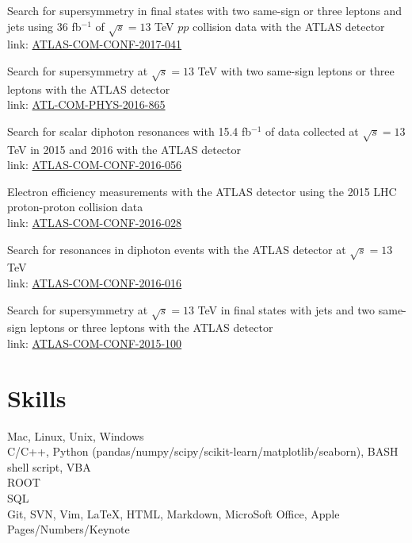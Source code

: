 \documentclass[letterpaper]{deedy-resume-openfont}
\begin{document}
\location{}
\begin{tightemize}
\item Search for supersymmetry in final states with two same-sign or three leptons and jets using 36 fb$^{-1}$ of $\sqrt{s} = 13$ TeV $pp$ collision data with the ATLAS detector\\
      link: \href{https://cds.cern.ch/record/2261952}{ATLAS-COM-CONF-2017-041}
\item Search for supersymmetry at $\sqrt{s} = 13$ TeV with two same-sign leptons or three leptons with the ATLAS detector\\
      link: \href{https://cds.cern.ch/record/2196580}{ATL-COM-PHYS-2016-865}
\item Search for scalar diphoton resonances with 15.4 fb$^{-1}$ of data collected at $\sqrt{s} = 13$ TeV in 2015 and 2016 with the ATLAS detector\\
      link: \href{https://cds.cern.ch/record/2199338}{ATLAS-COM-CONF-2016-056}
\item Electron efficiency measurements with the ATLAS detector using the 2015 LHC proton-proton collision data\\
      link: \href{https://cds.cern.ch/record/2142831}{ATLAS-COM-CONF-2016-028}
\item Search for resonances in diphoton events with the ATLAS detector at $\sqrt{s} = 13$ TeV\\
      link: \href{https://cds.cern.ch/record/2138074}{ATLAS-COM-CONF-2016-016}
\item Search for supersymmetry at $\sqrt{s} = 13$ TeV in final states with jets and two same-sign leptons or three leptons with the ATLAS detector\\
      link: \href{https://cds.cern.ch/record/2114088}{ATLAS-COM-CONF-2015-100}
\end{tightemize}
\sectionsep




\section{Skills}

Mac, Linux, Unix, Windows\\
C/C++, Python (pandas/numpy/scipy/scikit-learn/matplotlib/seaborn), BASH shell script, VBA\\
ROOT\\
SQL\\
Git, SVN, Vim, \LaTeX, HTML, Markdown, MicroSoft Office, Apple Pages/Numbers/Keynote\\
\sectionsep
\end{document}
